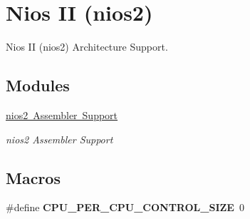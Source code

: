 \hypertarget{group__RTEMSScoreCPUnios2}{}\section{Nios II (nios2)}
\label{group__RTEMSScoreCPUnios2}


Nios II (nios2) Architecture Support.  


\subsection*{Modules}
\begin{DoxyCompactItemize}
\item 
\mbox{\hyperlink{group__RTEMSScoreCPUnios2ASM}{nios2 Assembler Support}}
\begin{DoxyCompactList}\small\item\em nios2 Assembler Support \end{DoxyCompactList}\end{DoxyCompactItemize}
\subsection*{Macros}
\begin{DoxyCompactItemize}
\item 
\mbox{\label{group__RTEMSScoreCPUnios2_gaf8e38596ad3db49995fd8eb9fb4e86b2}} 
\#define {\bfseries C\+P\+U\+\_\+\+P\+E\+R\+\_\+\+C\+P\+U\+\_\+\+C\+O\+N\+T\+R\+O\+L\+\_\+\+S\+I\+ZE}~0
\end{DoxyCompactItemize}
